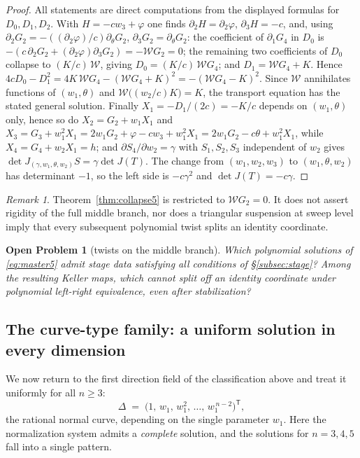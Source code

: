 \documentclass[11pt]{article}
\numberwithin{equation}{section}
\theoremstyle{plain}
\newtheorem{problem}[theorem]{Open Problem}
\theoremstyle{definition}
\theoremstyle{remark}
\newtheorem{remark}[theorem]{Remark}
\begin{document}
\begin{proof}
All statements are direct computations from the displayed formulas for
$D_0,D_1,D_2$. With $H=-cw_3+\varphi$ one finds
$\partial_2H=\partial_2\varphi$, $\partial_3H=-c$, and, using
$\partial_2G_2=-((\partial_2\varphi)/c)\partial_\theta G_2$,
$\partial_3G_2=\partial_\theta G_2$:
the coefficient of $\partial_1G_4$ in $D_0$ is
$-(c\,\partial_2G_2+(\partial_2\varphi)\partial_3G_2)=-\mathcal WG_2=0$; the remaining
two coefficients of $D_0$ collapse to $(K/c)\,\mathcal W$, giving
$D_0=(K/c)\,\mathcal WG_4$; and $D_1=\mathcal WG_4+K$. Hence
$4cD_0-D_1^2=4K\,\mathcal WG_4-(\mathcal WG_4+K)^2=-(\mathcal WG_4-K)^2$.
Since $\mathcal W$ annihilates functions of $(w_1,\theta)$ and
$\mathcal W\bigl((w_2/c)K\bigr)=K$, the transport equation has the stated general
solution. Finally $X_1=-D_1/(2c)=-K/c$ depends on $(w_1,\theta)$ only, hence so
do $X_2=G_2+w_1X_1$ and
$X_3=G_3+w_1^2X_1=2w_1G_2+\varphi-cw_3+w_1^2X_1=2w_1G_2-c\theta+w_1^2X_1$, while
$X_4=G_4+w_2X_1=h$; and $\partial S_4/\partial w_2=\gamma$ with
$S_1,S_2,S_3$ independent of $w_2$ gives
$\det J_{(\gamma,w_1,\theta,w_2)}S=\gamma\det J(T)$.
The change from $(w_1,w_2,w_3)$ to $(w_1,\theta,w_2)$ has determinant
$-1$, so the left side is $-c\gamma^2$ and $\det J(T)=-c\gamma$.
\end{proof}

\begin{remark}\label{rem:middle-scope}
Theorem~\ref{thm:collapse5} is restricted to $\mathcal WG_2=0$.
It does not assert rigidity of the full middle branch, nor does a
triangular suspension at sweep level imply that every subsequent
polynomial twist splits an identity coordinate.
\end{remark}

\begin{problem}[twists on the middle branch]\label{prob:rigid5}
Which polynomial solutions of \eqref{eq:master5} admit stage data
satisfying all conditions of \S\ref{subsec:stage}? Among the resulting
Keller maps, which cannot split off an identity coordinate under
polynomial left-right equivalence, even after stabilization?
\end{problem}

\subsection{The curve-type family: a uniform solution in every dimension}
\label{subsec:curvefam}

We now return to the first direction field of the classification above and
treat it uniformly for all $n\ge3$:
\[
\Delta\;=\;\bigl(1,\,w_1,\,w_1^2,\,\dots,\,w_1^{\,n-2}\bigr)^{\mathsf T},
\]
the rational normal curve, depending on the single parameter $w_1$. Here the
normalization system admits a \emph{complete} solution, and the solutions for
$n=3,4,5$ fall into a single pattern.
\end{document}
